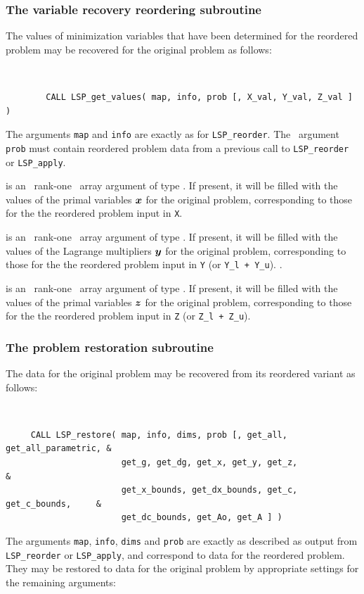 \documentclass{galahad}
\newcommand{\packagename}{LSP}
\begin{document}

\subsubsection{The  variable recovery reordering subroutine}
The values of minimization variables that have been determined for the 
reordered problem may be recovered for the original problem as follows: 
\vspace*{-2mm}
{\tt 
\begin{verbatim}
        CALL LSP_get_values( map, info, prob [, X_val, Y_val, Z_val ] )
\end{verbatim}
}
\vspace*{-1mm}
\noindent
The arguments {\tt map} and {\tt info} are exactly as for 
{\tt \packagename\_reorder}. 
The \intentin\ argument {\tt prob}
must contain reordered problem data from a previous call 
to {\tt LSP\_reorder} or {\tt LSP\_apply}.

\begin{description}
 is an \optional\ rank-one \intentout\ array argument of 
type \realdp. If 
present, it will be filled with the values of the primal variables ${\bm{x}}$ 
for the original problem, corresponding to those for the the reordered 
problem input in {\tt X}. 
 
 is an \optional\ rank-one \intentout\ array argument of 
type \realdp. If present, 
it will be filled with the values of the Lagrange multipliers ${\bm{y}}$ 
for the original problem, corresponding to those for the the reordered 
problem input in {\tt Y} (or {\tt Y\_l + Y\_u}).
. 
 
 is an \optional\ rank-one \intentout\ array argument of 
type \realdp. If 
present, it will be filled with the values of the primal variables ${\bm{z}}$ 
for the original problem, corresponding to those for the the reordered 
problem input in {\tt Z} (or {\tt Z\_l + Z\_u}).
\end{description}


\subsubsection{The  problem restoration subroutine}
The data for the original problem may be recovered from its reordered 
variant as follows:
\vspace*{-2mm}
{\tt 
\begin{verbatim}
     CALL LSP_restore( map, info, dims, prob [, get_all, get_all_parametric, &
                       get_g, get_dg, get_x, get_y, get_z,                   &
                       get_x_bounds, get_dx_bounds, get_c, get_c_bounds,     &
                       get_dc_bounds, get_Ao, get_A ] )
\end{verbatim}
}
\vspace*{-1mm}
\noindent
The arguments {\tt map}, {\tt info}, {\tt dims} and {\tt prob} are 
exactly as described as output from 
{\tt \packagename\_reorder} or {\tt \packagename\_apply},
and correspond to data for the reordered problem. 
They may be restored to data for the original problem by appropriate 
settings for the remaining arguments: 
\end{document}
